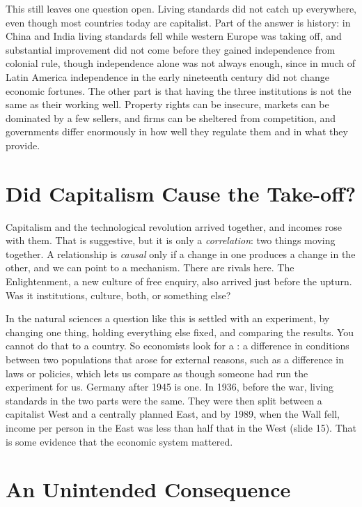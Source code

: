 \documentclass[11pt]{article}
\begin{document}
This still leaves one question open. Living standards did not catch up everywhere, even though most countries today are capitalist. Part of the answer is history: in China and India living standards fell while western Europe was taking off, and substantial improvement did not come before they gained independence from colonial rule, though independence alone was not always enough, since in much of Latin America independence in the early nineteenth century did not change economic fortunes. The other part is that having the three institutions is not the same as their working well. Property rights can be insecure, markets can be dominated by a few sellers, and firms can be sheltered from competition, and governments differ enormously in how well they regulate them and in what they provide.

\section{Did Capitalism Cause the Take-off?}

Capitalism and the technological revolution arrived together, and incomes rose with them. That is suggestive, but it is only a \emph{correlation}: two things moving together. A relationship is \emph{causal} only if a change in one produces a change in the other, and we can point to a mechanism. There are rivals here. The Enlightenment, a new culture of free enquiry, also arrived just before the upturn. Was it institutions, culture, both, or something else?

In the natural sciences a question like this is settled with an experiment, by changing one thing, holding everything else fixed, and comparing the results. You cannot do that to a country. So economists look for a : a difference in conditions between two populations that arose for external reasons, such as a difference in laws or policies, which lets us compare as though someone had run the experiment for us. Germany after 1945 is one. In 1936, before the war, living standards in the two parts were the same. They were then split between a capitalist West and a centrally planned East, and by 1989, when the Wall fell, income per person in the East was less than half that in the West (slide 15). That is some evidence that the economic system mattered.

\section{An Unintended Consequence}
\end{document}
